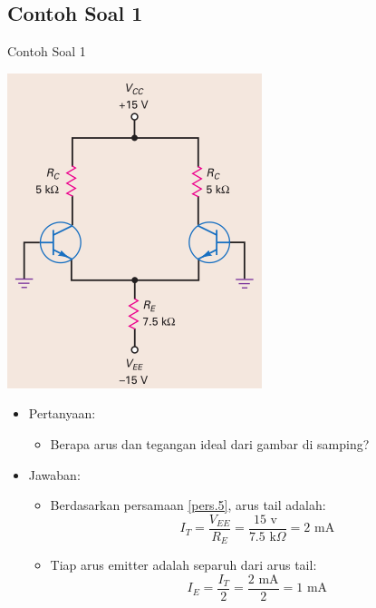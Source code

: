 \documentclass[aspectratio=169]{beamer}
\begin{document}
\subsection{Contoh Soal 1}
\begin{frame}{Contoh Soal 1}
	\begin{multicols}{2}
		\begin{center}
			\includegraphics[width=0.6\textheight]{gambar/01.diff-amp/01.latihan_soal_1a}
		\end{center}
		\columnbreak
		\begin{itemize}
			\item Pertanyaan:
			\begin{itemize}
				\item Berapa arus dan tegangan ideal dari gambar di samping?
			\end{itemize}
			\item Jawaban:
			\begin{itemize}
				\item Berdasarkan persamaan \ref{pers.5}, arus tail adalah:
				\[I_T = \frac{V_{EE}}{R_E} = \frac{15 \text{ v }}{7.5 \text{ k}\Omega} = 2 \text{ mA} \]
				\item Tiap arus emitter adalah separuh dari arus tail:
				\[ I_E = \frac{I_T}{2} = \frac{2 \text{ mA}}{2} = 1 \text{ mA} \]
			\end{itemize}
		\end{itemize}
		\vfill\null
	\end{multicols}
\end{frame}
\end{document}
